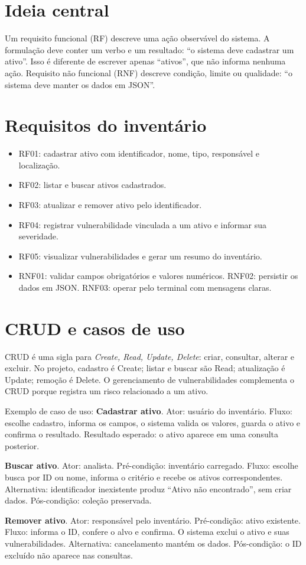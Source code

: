 \documentclass[11pt,a4paper]{article}
\begin{document}
\enlargethispage{3\baselineskip}
\section*{Ideia central}
Um requisito funcional (RF) descreve uma ação observável do sistema. A formulação deve conter um verbo e um resultado: ``o sistema deve cadastrar um ativo''. Isso é diferente de escrever apenas ``ativos'', que não informa nenhuma ação. Requisito não funcional (RNF) descreve condição, limite ou qualidade: ``o sistema deve manter os dados em JSON''.
\section*{Requisitos do inventário}
\begin{itemize}
\item RF01: cadastrar ativo com identificador, nome, tipo, responsável e localização.
\item RF02: listar e buscar ativos cadastrados.
\item RF03: atualizar e remover ativo pelo identificador.
\item RF04: registrar vulnerabilidade vinculada a um ativo e informar sua severidade.
\item RF05: visualizar vulnerabilidades e gerar um resumo do inventário.
\item RNF01: validar campos obrigatórios e valores numéricos. RNF02: persistir os dados em JSON. RNF03: operar pelo terminal com mensagens claras.
\end{itemize}
\section*{CRUD e casos de uso}
CRUD é uma sigla para \textit{Create, Read, Update, Delete}: criar, consultar, alterar e excluir. No projeto, cadastro é Create; listar e buscar são Read; atualização é Update; remoção é Delete. O gerenciamento de vulnerabilidades complementa o CRUD porque registra um risco relacionado a um ativo.

Exemplo de caso de uso: \textbf{Cadastrar ativo}. Ator: usuário do inventário. Fluxo: escolhe cadastro, informa os campos, o sistema valida os valores, guarda o ativo e confirma o resultado. Resultado esperado: o ativo aparece em uma consulta posterior.
\par\medskip
\textbf{Buscar ativo}. Ator: analista. Pré-condição: inventário carregado. Fluxo: escolhe busca por ID ou nome, informa o critério e recebe os ativos correspondentes. Alternativa: identificador inexistente produz ``Ativo não encontrado'', sem criar dados. Pós-condição: coleção preservada.
\par\medskip
\textbf{Remover ativo}. Ator: responsável pelo inventário. Pré-condição: ativo existente. Fluxo: informa o ID, confere o alvo e confirma. O sistema exclui o ativo e suas vulnerabilidades. Alternativa: cancelamento mantém os dados. Pós-condição: o ID excluído não aparece nas consultas.
\end{document}
